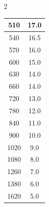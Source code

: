 \documentclass[11pt,letterpaper]{article}
\begin{document}
\begin{multicols}{2}
\begin{tabular}{|c|c|}
		510  & 17.0  \\ \hline
		540  & 16.5  \\ \hline
		570  & 16.0  \\ \hline
		600  & 15.0  \\ \hline
		630  & 14.0  \\ \hline
		660  & 14.0  \\ \hline
		720  & 13.0  \\ \hline
		780  & 12.0  \\ \hline
		840  & 11.0  \\ \hline
		900  & 10.0  \\ \hline
		1020 & 9.0   \\ \hline
		1080 & 8.0   \\ \hline
		1260 & 7.0   \\ \hline
		1380 & 6.0   \\ \hline
		1620 & 5.0   \\ \hline
	\end{tabular}


\end{multicols}
\end{document}
